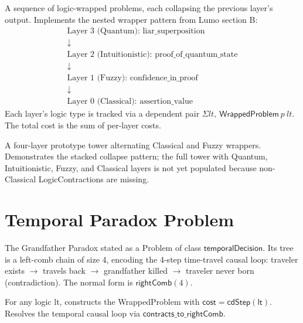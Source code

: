 \begin{definition}[Tower]
\label{def:tower}
\leanok
{}
A sequence of logic-wrapped problems, each collapsing the previous layer's output.
Implements the nested wrapper pattern from Lumo section B:
\[
\begin{array}{c}
\text{Layer 3 (Quantum): liar\_superposition} \\
\downarrow \\
\text{Layer 2 (Intuitionistic): proof\_of\_quantum\_state} \\
\downarrow \\
\text{Layer 1 (Fuzzy): confidence\_in\_proof} \\
\downarrow \\
\text{Layer 0 (Classical): assertion\_value}
\end{array}
\]
Each layer's logic type is tracked via a dependent pair $\Sigma lt,\ \mathsf{WrappedProblem}\ p\ lt$.
The total cost is the sum of per-layer costs.
\end{definition}

\begin{definition}
\label{def:liar_tower}
\leanok
{}
A four-layer prototype tower alternating Classical and Fuzzy wrappers.
Demonstrates the stacked collapse pattern; the full tower with Quantum,
Intuitionistic, Fuzzy, and Classical layers is not yet populated because
non-Classical \textsf{LogicContraction}s are missing.
\end{definition}

\section{Temporal Paradox Problem}

\begin{definition}
\label{def:grandfather_problem}
\leanok
{}
The Grandfather Paradox stated as a \textsf{Problem} of class $\mathsf{temporalDecision}$.
Its tree is a left-comb chain of size 4, encoding the 4-step time-travel causal loop:
traveler exists $\to$ travels back $\to$ grandfather killed $\to$ traveler never born (contradiction).
The normal form is $\mathsf{rightComb}(4)$.
\end{definition}

\begin{definition}
\label{def:grandfather_wrapper}
\leanok
{}
For any logic \textsf{lt}, constructs the \textsf{WrappedProblem} with
$\textsf{cost} = \textsf{cdStep}(\textsf{lt})$. Resolves the temporal causal loop
via $\mathsf{contracts\_to\_rightComb}$.
\end{definition}

